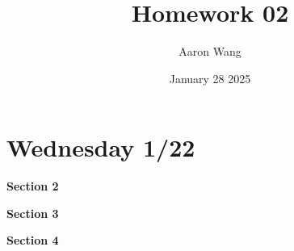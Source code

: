 \documentclass{article}
\title{Homework 02}
\author{Aaron Wang}
\date{January 28 2025}
\begin{document}
\maketitle
\section{Wednesday 1/22}
\begin{large}
 \textbf{Section 2}   
\end{large}


\begin{enumerate}
    
\end{enumerate}
\begin{large}
 \textbf{Section 3}   
\end{large}
\begin{enumerate}
    
    
    
\newpage
    
    
\end{enumerate}
\newpage
\begin{large}
 \textbf{Section 4}   
\end{large}
\begin{enumerate}
    
\newpage
     
\end{enumerate}
\end{document}
